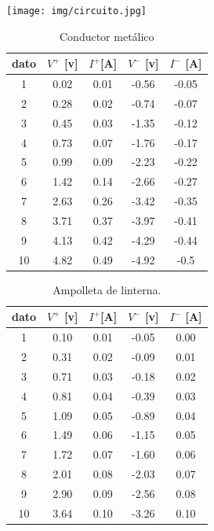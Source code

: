 \documentclass[]{article}
\begin{document}
\begin{enumerate}
\texttt{[image: img/circuito.jpg]}
\end{enumerate}


\begin{table}
  \centering
  \begin{tabular}{|c|c|c|c|c|} \hline
    dato    &   $V^{+}$ [v]  &    $I^{+}$[A]  &   $V^{-}$ [v]  &    $I^{-}$ [A]  \\ \hline
    1       & 0.02 &0.01   &-0.56 &-0.05 \\ \hline
    2      &0.28  &0.02     &-0.74 &-0.07 \\ \hline
    3      &0.45  &0.03     &-1.35 &-0.12 \\ \hline
    4       &0.73  &0.07    &-1.76 &-0.17 \\ \hline
    5       &0.99  &0.09    &-2.23 &-0.22 \\ \hline
    6       &1.42  &0.14    &-2.66 &-0.27 \\ \hline
    7       &2.63  &0.26    &-3.42 &-0.35 \\ \hline
    8       &3.71  &0.37    &-3.97 &-0.41 \\ \hline
    9       &4.13  &0.42    &-4.29 &-0.44 \\ \hline
    10       &4.82  &0.49   &-4.92 &-0.5 \\ \hline

  \end{tabular}
  \caption{\label{tab: transitor} Conductor metálico}
\end{table}






\begin{table}
  \centering
  \begin{tabular}{|c|c|c|c|c|} \hline
    dato    &   $V^{+}$ [v]  &    $I^{+}$[A]  &   $V^{-}$ [v]  &    $I^{-}$ [A]  \\ \hline
    1& 0.10 &0.01 &-0.05& 0.00 \\ \hline
    2&0.31 &0.02  &-0.09& 0.01 \\ \hline
    3&0.71 &0.03 &-0.18& 0.02 \\ \hline
    4&0.81 &0.04 &-0.39& 0.03 \\ \hline
    5&1.09 &0.05 &-0.89& 0.04 \\ \hline
    6& 1.49 &0.06 &-1.15& 0.05 \\ \hline
    7& 1.72 &0.07 &-1.60& 0.06 \\ \hline
    8& 2.01 &0.08 &-2.03& 0.07 \\ \hline
    9& 2.90 &0.09  &-2.56& 0.08 \\ \hline
    10& 3.64 &0.10 &-3.26& 0.10 \\ \hline
    
    
  \end{tabular}
  \caption{\label{tab: ampolleta} Ampolleta de linterna. }
\end{table}
\end{document}
